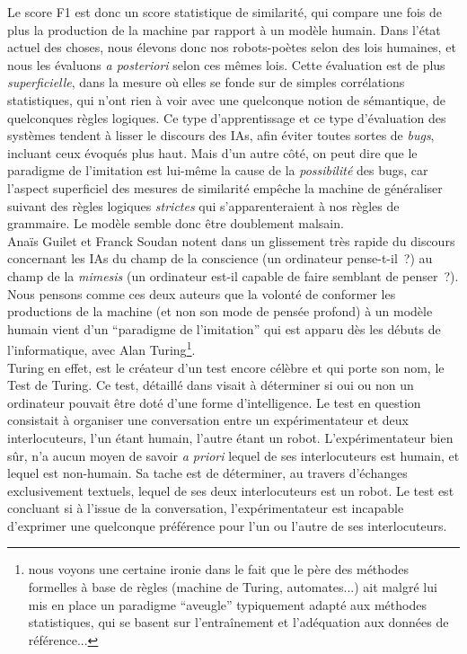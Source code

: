 \documentclass{article}
\begin{document}
					Le score F1 est donc un score statistique de similarité, qui compare une fois de plus la production de la machine par rapport à un modèle humain. Dans l'état actuel des choses, nous élevons donc nos robots-poètes selon des lois humaines, et nous les évaluons \textit{a posteriori} selon ces mêmes lois. Cette évaluation est de plus \textit{superficielle}, dans la mesure où elles se fonde sur de simples corrélations statistiques, qui n'ont rien à voir avec une quelconque notion de sémantique, de quelconques règles logiques. Ce type d'apprentissage et ce type d'évaluation des systèmes tendent à lisser le discours des IAs, afin éviter toutes sortes de \textit{bugs}, incluant ceux évoqués plus haut. Mais d'un autre côté, on peut dire que le paradigme de l'imitation est lui-même la cause de la \textit{possibilité} des bugs, car l'aspect superficiel des mesures de similarité empêche la machine de généraliser suivant des règles logiques \textit{strictes} qui s'apparenteraient à nos règles de grammaire. Le modèle semble donc être doublement malsain.\\
					
					Anaïs Guilet et Franck Soudan notent dans \cite{guilet2017} un glissement très rapide du discours concernant les IAs du champ de la conscience (un ordinateur pense-t-il~?) au champ de la \textit{mimesis} (un ordinateur est-il capable de faire semblant de penser~?). Nous pensons comme ces deux auteurs que la volonté de conformer les productions de la machine (et non son mode de pensée profond) à un modèle humain vient d'un ``paradigme de l'imitation'' qui est apparu dès les débuts de l'informatique, avec Alan Turing\footnote{nous voyons une certaine ironie dans le fait que le père des méthodes formelles à base de règles (machine de Turing, automates...) ait malgré lui mis en place un paradigme ``aveugle'' typiquement adapté aux méthodes statistiques, qui se basent sur l'entraînement et l'adéquation aux données de référence...}. \\
					
					Turing en effet, est le créateur d'un test encore célèbre et qui porte son nom, le Test de Turing. Ce test, détaillé dans \cite{turing1950} visait à déterminer si oui ou non un ordinateur pouvait être doté d'une forme d'intelligence. Le test en question consistait à organiser une conversation entre un expérimentateur et deux interlocuteurs, l'un étant humain, l'autre étant un robot. L'expérimentateur bien sûr, n'a aucun moyen de savoir \textit{a priori} lequel de ses interlocuteurs est humain, et lequel est non-humain. Sa tache est de déterminer, au travers d'échanges exclusivement textuels, lequel de ses deux interlocuteurs est un robot. Le test est concluant si à l'issue de la conversation, l'expérimentateur est incapable d'exprimer une quelconque préférence pour l'un ou l'autre de ses interlocuteurs.\\
					
\end{document}
